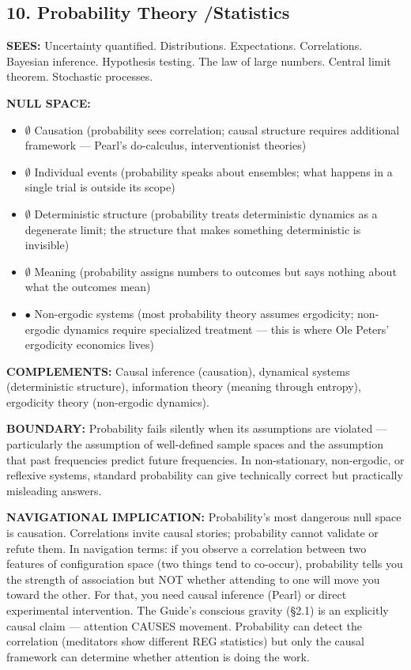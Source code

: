 \bigskip\noindent\makebox[\textwidth]{\color{rulegray}\rule{5cm}{0.3pt}}\bigskip


\subsection*{10. Probability Theory /\allowbreak  Statistics}


\textbf{SEES:} Uncertainty quantified. Distributions. Expectations. Correlations. Bayesian inference. Hypothesis testing. The law of large numbers. Central limit theorem. Stochastic processes.


\textbf{NULL SPACE:}

\begin{itemize}[nosep,leftmargin=*]
  \item $\emptyset$ Causation (probability sees correlation; causal structure requires additional framework — Pearl's do-calculus, interventionist theories)
  \item $\emptyset$ Individual events (probability speaks about ensembles; what happens in a single trial is outside its scope)
  \item $\emptyset$ Deterministic structure (probability treats deterministic dynamics as a degenerate limit; the structure that makes something deterministic is invisible)
  \item $\emptyset$ Meaning (probability assigns numbers to outcomes but says nothing about what the outcomes mean)
  \item $\bullet$ Non-ergodic systems (most probability theory assumes ergodicity; non-ergodic dynamics require specialized treatment — this is where Ole Peters' ergodicity economics lives)
\end{itemize}


\textbf{COMPLEMENTS:} Causal inference (causation), dynamical systems (deterministic structure), information theory (meaning through entropy), ergodicity theory (non-ergodic dynamics).


\textbf{BOUNDARY:} Probability fails silently when its assumptions are violated — particularly the assumption of well-defined sample spaces and the assumption that past frequencies predict future frequencies. In non-stationary, non-ergodic, or reflexive systems, standard probability can give technically correct but practically misleading answers.


\textbf{NAVIGATIONAL IMPLICATION:} Probability's most dangerous null space is causation. Correlations invite causal stories; probability cannot validate or refute them. In navigation terms: if you observe a correlation between two features of configuration space (two things tend to co-occur), probability tells you the strength of association but NOT whether attending to one will move you toward the other. For that, you need causal inference (Pearl) or direct experimental intervention. The Guide's conscious gravity (§2.1) is an explicitly causal claim — attention CAUSES movement. Probability can detect the correlation (meditators show different REG statistics) but only the causal framework can determine whether attention is doing the work.


